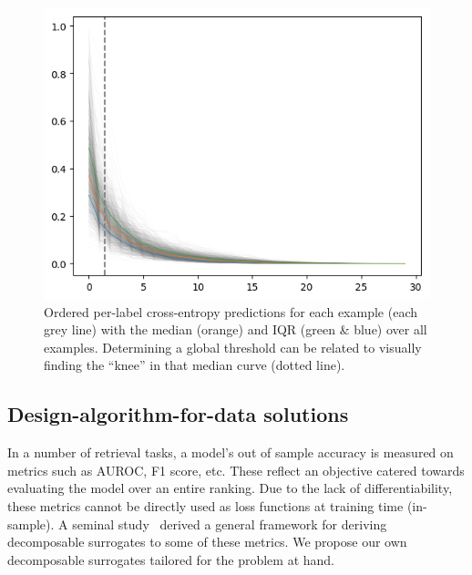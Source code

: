 
\begin{figure}[htbp]
\centering
\includegraphics[width=.9\linewidth]{./images/knee.png}
\caption{\label{fig:knee}
Ordered per-label cross-entropy predictions for each example (each grey line) with the median (orange) and IQR (green \& blue) over all examples. Determining a global threshold can be related to visually finding the ``knee'' in that median curve (dotted line).}
\end{figure}


\subsection{Design-algorithm-for-data solutions}
\label{section:background:solution}

In a number of retrieval tasks, a model's out of sample accuracy is measured
on metrics such as AUROC, F1 score, etc. These reflect an objective catered
towards evaluating the model over an entire ranking. Due to the lack of
differentiability, these metrics cannot be directly used as loss functions at
training time (in-sample). A seminal study~\cite{optimizableLosses} derived a
general framework for deriving decomposable surrogates to some of these
metrics. We propose our own decomposable surrogates tailored for the problem
at hand.


